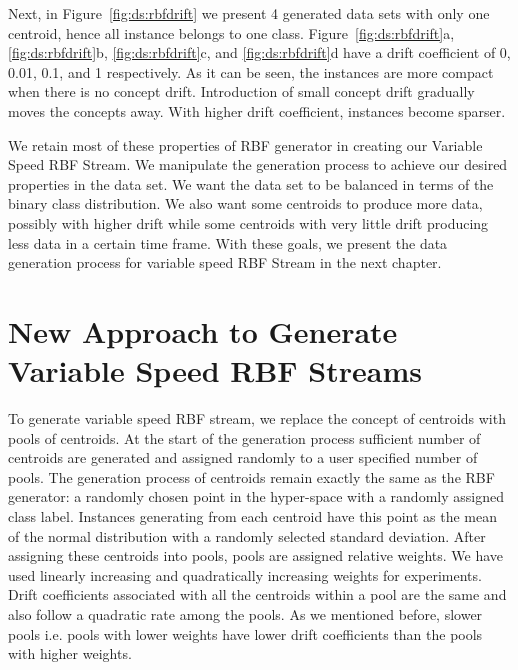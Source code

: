 Next, in Figure~\ref{fig:ds:rbfdrift} we present 4 generated data sets with only one centroid, hence all instance belongs to one class. Figure~\ref{fig:ds:rbfdrift}a, \ref{fig:ds:rbfdrift}b, \ref{fig:ds:rbfdrift}c, and \ref{fig:ds:rbfdrift}d have a drift coefficient of 0, 0.01, 0.1, and 1 respectively. As it can be seen, the instances are more compact when there is no concept drift. Introduction of small concept drift gradually moves the concepts away. With higher drift coefficient, instances become sparser.

We retain most of these properties of RBF generator in creating our Variable Speed RBF Stream. We manipulate the generation process to achieve our desired properties in the data set. We want the data set to be balanced in terms of the binary class distribution. We also want some centroids to produce more data, possibly with higher drift while some centroids with very little drift producing less data in a certain time frame. With these goals, we present the data generation process for variable speed RBF Stream in the next chapter.

\section{New Approach to Generate Variable Speed RBF Streams}
To generate variable speed RBF stream, we replace the concept of centroids with pools of centroids. At the start of the generation process sufficient number of centroids are generated and assigned randomly to a user specified number of pools. The generation process of centroids remain exactly the same as the RBF generator: a randomly chosen point in the hyper-space with a randomly assigned class label. Instances generating from each centroid have this point as the mean of the normal distribution with a randomly selected standard deviation. After assigning these centroids into pools, pools are assigned relative weights. We have used linearly increasing and quadratically increasing weights for experiments. Drift coefficients associated with all the centroids within a pool are the same and also follow  a quadratic rate among the pools. As we mentioned before, slower pools i.e. pools with lower weights have lower drift coefficients than the pools with higher weights.

